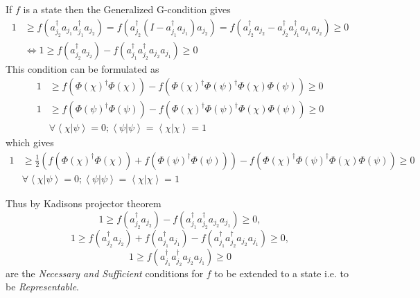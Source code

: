 \documentclass[aps,preprint]{revtex4}%
\begin{document}
If $f$ is a state then the Generalized G-condition gives
\begin{align}
1  &  \geq f\left(  a_{j_{2}}^{\dagger}a_{j_{1}}a_{j_{1}}^{\dagger}a_{j_{2}%
}\right)  =f\left(  a_{j_{2}}^{\dagger}\left(  I-a_{j_{1}}^{\dagger}a_{j_{1}%
}\right)  a_{j_{2}}\right)  =f\left(  a_{j_{2}}^{\dagger}a_{j_{2}}-a_{j_{2}%
}^{\dagger}a_{j_{1}}^{\dagger}a_{j_{1}}a_{j_{2}}\right)  \geq0\nonumber\\
&  \Leftrightarrow1\geq f\left(  a_{j_{2}}^{\dagger}a_{j_{2}}\right)
-f\left(  a_{j_{1}}^{\dagger}a_{j_{2}}^{\dagger}a_{j_{2}}a_{j_{1}}\right)
\geq0
\end{align}
This condition can be formulated as
\begin{align}
1  &  \geq f\left(  \Phi\left(  \chi\right)  ^{\dagger}\Phi\left(
\chi\right)  \right)  -f\left(  \Phi\left(  \chi\right)  ^{\dagger}\Phi\left(
\psi\right)  ^{\dagger}\Phi\left(  \chi\right)  \Phi\left(  \psi\right)
\right)  \geq0\nonumber\\
1  &  \geq f\left(  \Phi\left(  \psi\right)  ^{\dagger}\Phi\left(
\psi\right)  \right)  -f\left(  \Phi\left(  \chi\right)  ^{\dagger}\Phi\left(
\psi\right)  ^{\dagger}\Phi\left(  \chi\right)  \Phi\left(  \psi\right)
\right)  \geq0\nonumber\\
&  \left.  \forall\right.  \left\langle \chi\left\vert \psi\right.
\right\rangle =0;\left\langle \psi\left\vert \psi\right.  \right\rangle
=\left\langle \chi\left\vert \chi\right.  \right\rangle =1
\end{align}
which gives
\begin{align}
1  &  \geq\frac{1}{2}\left(  f\left(  \Phi\left(  \chi\right)  ^{\dagger}%
\Phi\left(  \chi\right)  \right)  +f\left(  \Phi\left(  \psi\right)
^{\dagger}\Phi\left(  \psi\right)  \right)  \right)  -f\left(  \Phi\left(
\chi\right)  ^{\dagger}\Phi\left(  \psi\right)  ^{\dagger}\Phi\left(
\chi\right)  \Phi\left(  \psi\right)  \right)  \geq0\nonumber\\
&  \left.  \forall\right.  \left\langle \chi\left\vert \psi\right.
\right\rangle =0;\left\langle \psi\left\vert \psi\right.  \right\rangle
=\left\langle \chi\left\vert \chi\right.  \right\rangle =1
\end{align}


Thus by Kadisons projector theorem
\begin{equation}
1\geq f\left(  a_{j_{2}}^{\dagger}a_{j_{2}}\right)  -f\left(  a_{j_{1}%
}^{\dagger}a_{j_{2}}^{\dagger}a_{j_{2}}a_{j_{1}}\right)  \geq0,
\end{equation}%
\begin{equation}
1\geq f\left(  a_{j_{2}}^{\dagger}a_{j_{2}}\right)  +f\left(  a_{j_{1}%
}^{\dagger}a_{j_{1}}\right)  -f\left(  a_{j_{1}}^{\dagger}a_{j_{2}}^{\dagger
}a_{j_{2}}a_{j_{1}}\right)  \geq0,
\end{equation}%
\begin{equation}
1\geq f\left(  a_{j_{1}}^{\dagger}a_{j_{2}}^{\dagger}a_{j_{2}}a_{j_{1}%
}\right)  \geq0
\end{equation}
are the \emph{Necessary and Sufficient} conditions for $f$ to be extended to a
state i.e. to be \emph{Representable}.
\end{document}
